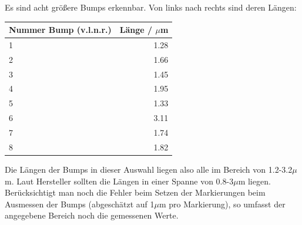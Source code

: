 \clearpage

Es sind acht größere Bumps erkennbar. Von links nach rechts 
sind deren Längen: 

\begin{center}
    \centering
    \begin{tabular}{l|r}
        Nummer Bump (v.l.n.r.) & Länge / $\mu$m \\
        \hline
        1 & 1.28\\
        2 & 1.66\\
        3 & 1.45 \\
        4 & 1.95 \\
        5 & 1.33 \\
        6 & 3.11 \\
        7 & 1.74 \\
        8 & 1.82 \\
        
    \end{tabular}
\end{center}

Die Längen der Bumps in dieser Auswahl liegen also alle im Bereich von 1.2-3.2$\mu$m. Laut Hersteller sollten die Längen in einer Spanne von 
0.8-3$\mu$m liegen. Berücksichtigt man noch die Fehler beim Setzen der Markierungen beim Ausmessen der Bumps (abgeschätzt auf 1$\mu$m 
pro Markierung), so umfasst der angegebene Bereich noch die gemessenen Werte. 